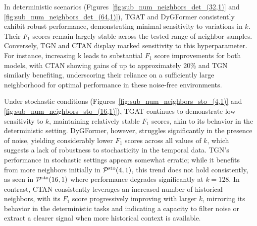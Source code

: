In deterministic scenarios (Figures~\ref{fig:sub_num_neighbors_det_(32,1)} and \ref{fig:sub_num_neighbors_det_(64,1)}), TGAT and DyGFormer consistently exhibit robust performance, demonstrating minimal sensitivity to variations in $k$. Their $F_1$ scores remain largely stable across the tested range of neighbor samples. Conversely, TGN and CTAN display marked sensitivity to this hyperparameter. For instance, increasing k leads to substantial $F_1$ score improvements for both models, with CTAN showing gains of up to approximately 20\% and TGN similarly benefiting, underscoring their reliance on a sufficiently large neighborhood for optimal performance in these noise-free environments.


Under stochastic conditions (Figures~\ref{fig:sub_num_neighbors_sto_(4,1)} and \ref{fig:sub_num_neighbors_sto_(16,1)}), TGAT continues to demonstrate low sensitivity to $k$, maintaining relatively stable $F_1$ scores, akin to its behavior in the deterministic setting. DyGFormer, however, struggles significantly in the presence of noise, yielding considerably lower $F_1$ scores across all values of $k$, which suggests a lack of robustness to stochasticity in the temporal data. TGN's performance in stochastic settings appears somewhat erratic; while it benefits from more neighbors initially in $\mathcal{P}^\text{sto}(4, 1)$, this trend does not hold consistently, as seen in $\mathcal{P}^\text{sto}(16, 1)$ where performance degrades significantly at $k = 128$. In contrast, CTAN consistently leverages an increased number of historical neighbors, with its $F_1$ score progressively improving with larger $k$, mirroring its behavior in the deterministic tasks and indicating a capacity to filter noise or extract a clearer signal when more historical context is available.

